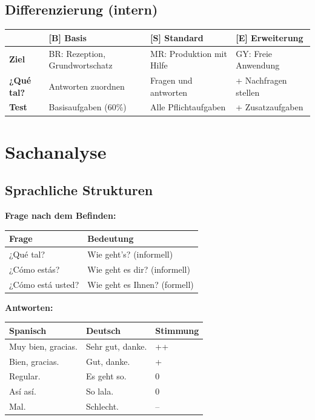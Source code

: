 \documentclass[11pt,a4paper]{article}
\newcommand{\B}{\textcolor{basis}{\textbf{[B]}}}
\newcommand{\Std}{\textcolor{standard}{\textbf{[S]}}}
\newcommand{\E}{\textcolor{erweiterung}{\textbf{[E]}}}
\begin{document}
\subsection{Differenzierung (intern)}
\begin{tabular}{|l|p{3.5cm}|p{3.5cm}|p{3.5cm}|}
\hline
& \B{} \textbf{Basis} & \Std{} \textbf{Standard} & \E{} \textbf{Erweiterung} \\
\hline
\textbf{Ziel} & BR: Rezeption, Grundwortschatz & MR: Produktion mit Hilfe & GY: Freie Anwendung \\
\hline
\textbf{¿Qué tal?} & Antworten zuordnen & Fragen und antworten & + Nachfragen stellen \\
\hline
\textbf{Test} & Basisaufgaben (60\%) & Alle Pflichtaufgaben & + Zusatzaufgaben \\
\hline
\end{tabular}

\section{Sachanalyse}

\subsection{Sprachliche Strukturen}

\textbf{Frage nach dem Befinden:}
\begin{center}
\begin{tabular}{|l|l|}
\hline
\textbf{Frage} & \textbf{Bedeutung} \\
\hline
¿Qué tal? & Wie geht's? (informell) \\
¿Cómo estás? & Wie geht es dir? (informell) \\
¿Cómo está usted? & Wie geht es Ihnen? (formell) \\
\hline
\end{tabular}
\end{center}

\textbf{Antworten:}
\begin{center}
\begin{tabular}{|l|l|l|}
\hline
\textbf{Spanisch} & \textbf{Deutsch} & \textbf{Stimmung} \\
\hline
Muy bien, gracias. & Sehr gut, danke. & ++ \\
Bien, gracias. & Gut, danke. & + \\
Regular. & Es geht so. & 0 \\
Así así. & So lala. & 0 \\
Mal. & Schlecht. & -- \\
\hline
\end{tabular}
\end{center}
\end{document}

